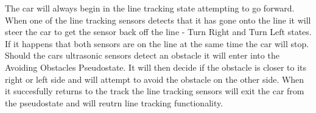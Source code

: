 \documentclass[conference]{IEEEtran}
\begin{document}
The car will always begin in the line tracking state attempting to go forward. When one of the line tracking sensors detects that it has gone onto the line it will steer the car to get the sensor back off the line - Turn Right and Turn Left states. If it happens that both sensors are on the line at the same time the car will stop. Should the cars ultrasonic sensors detect an obstacle it will enter into the Avoiding Obstacles Pseudostate. It will then decide if the obstacle is closer to its right or left side and will attempt to avoid the obstacle on the other side. When it succesfully returns to the track the line tracking sensors will exit the car from the pseudostate and will reutrn line tracking functionality.
\end{document}
